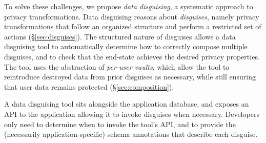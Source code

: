 
To solve these challenges, we propose \emph{data disguising}, a systematic approach to privacy
transformations. Data disguising reasons about \emph{disguises}, namely privacy transformations that
follow an organized structure and perform a restricted set of actions (\S\ref{sec:disguises}). 
The structured nature of disguises allows a data disguising tool to automatically determine how to correctly
compose multiple disguises, and to check that the end-state achieves the desired privacy properties.
The tool uses the abstraction of \emph{per-user vaults}, which allow the tool to
reintroduce destroyed data from prior disguises as necessary, while still ensuring that user data
remains protected (\S\ref{sec:composition}). 

A data disguising tool sits alongside the application database, and exposes an API to the
application allowing it to invoke disguises when necessary. Developers only need to determine when
to invoke the tool's API, and to provide the (necessarily application-specific) schema annotations
that describe each disguise.
